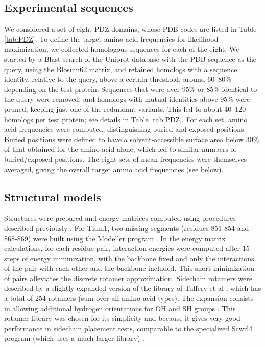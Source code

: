 \documentclass[12pt]{article}
\begin{document}
\subsection{Experimental sequences}
We considered a set of eight PDZ domains, whose PDB codes are listed in Table \ref{tab:PDZ}. To define the target amino
acid frequencies for likelihood maximization, we collected homologous sequences for each of the eight. We started by a Blast
search of the Uniprot database with the PDB sequence as the query, using the Blosum62 matrix, and retained homologs with a
sequence identity, relative to the query, above a certain threshold, around 60--80\% depending on the test protein. 
Sequences that were over 95\% or 85\% identical to the query were removed, and homologs with mutual identities above 95\%
were pruned, keeping just one of the redundant variants. This led to about 40--120 homologs per test protein; see details
in Table \ref{tab:PDZ}. For each set, amino acid frequencies were computed, distinguishing buried and exposed positions.
Buried positions were defined to have a solvent-accessible surface area below 30\% of that obtained for the amino acid alone,
which led to similar numbers of buried/exposed positions. The eight sets of mean frequencies were themselves averaged, giving
the overall target amino acid frequencies (see below).

\subsection{Structural models}
Structures were prepared and energy matrices computed using procedures described previously \cite{Schmidt09,Schmidt10}.
For Tiam1, two missing segments (residues 851-854 and 868-869) were built using the Modeller program \cite{Eswar06}.
In the energy matrix calculations, for each residue pair, interaction energies were computed after 15 steps of energy
minimization, with the backbone fixed and only the interactions of the pair with each other and the backbone included.
This short minimization of pairs alleviates the discrete rotamer approximation. Sidechain rotamers were described by a
slightly expanded version of the library of Tuffery et al \cite{Tuffery91}, which has a total of 254 rotamers (sum over
all amino acid types). The expansion consists in allowing additional hydrogen orientations for OH and SH groups
\cite{Gaillard14}. This rotamer library was chosen for its simplicity and because it gives very good performance in
sidechain placement tests, comparable to the specialized Scwrl4 program (which uses a much larger library) \cite{Krivov09,
Gaillard16}. 
\end{document}
